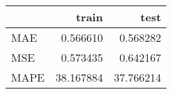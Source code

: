 \begin{tabular}{lrr}
\toprule
{} &      train &       test \\
\midrule
MAE  &   0.566610 &   0.568282 \\
MSE  &   0.573435 &   0.642167 \\
MAPE &  38.167884 &  37.766214 \\
\bottomrule
\end{tabular}
